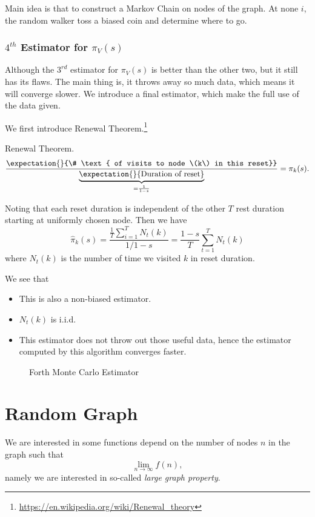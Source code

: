 \begin{prev}
	Main idea is that to construct a Markov Chain on nodes of the graph. At none \(i\), the random walker toss a biased coin and
	determine where to go.
\end{prev}

\subsection{\(4^{th}\) Estimator for \(\pi_V(s)\)}
Although the \(3^{rd}\) estimator for \(\pi_V(s)\) is better than the other two, but it still has its flaws. The main thing is, it throws away so much
data, which means it will converge slower. We introduce a final estimator, which make the full use of the data given.

We first introduce Renewal Theorem.\footnote{\url{https://en.wikipedia.org/wiki/Renewal_theory}}
\begin{theorem}
	Renewal Theorem.
	\[
		\frac{\expectation{}{\# \text{ of visits to node \(k\) in this reset}} }{\underbrace{\expectation{}{\text{Duration of reset}}}_{= \frac{1}{1-s}}} = \pi_k(s).
	\]

	Noting that each reset duration is independent of the other \(T\) rest duration starting at uniformly chosen node. Then we have
	\[
		\hat{\pi}_k(s) = \frac{\frac{1}{T}\sum\limits_{i=1}^{T} N_t(k)}{1/1-s} = \frac{1-s}{T}\sum\limits_{t=1}^{T} N_t(k)
	\]
	where \(N_t(k)\) is the number of time we visited \(k\) in reset duration.
\end{theorem}

\begin{remark}
	We see that
	\begin{itemize}
		\item This is also a non-biased estimator.
		\item \(N_t(k)\) is i.i.d.
		\item This estimator does not throw out those useful data, hence the estimator computed by this algorithm converges faster.
	\end{itemize}
\end{remark}

\begin{figure}[H]
	\centering
	\caption{Forth Monte Carlo Estimator}
	\label{fig:Monte-Carlo-Estimator-4}
\end{figure}

\chapter{Random Graph}
We are interested in some functions depend on the number of nodes \(n\) in the graph such that
\[
	\lim_{n\to \infty }f(n),
\]
namely we are interested in so-called \emph{large graph property}.

